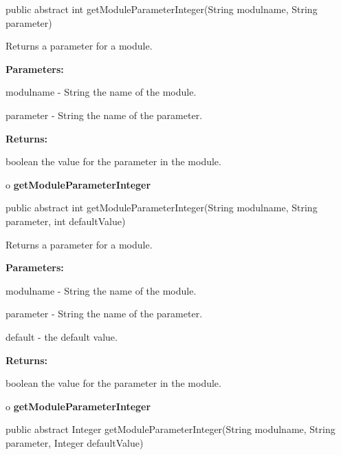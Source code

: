 \begin{PRE}
 public abstract int getModuleParameterInteger(String modulname,
                                               String parameter)
\end{PRE}

\begin{description}
\htmlDD Returns a parameter for a module. 

\begin{description}
\item {\bf Parameters:}  

modulname - String the name of the module.  

parameter - String the name of the parameter.  
\item {\bf Returns:}  

boolean the value for the parameter in the module.  
\end{description}

\end{description}

o {\bf getModuleParameterInteger} 

\begin{PRE}
 public abstract int getModuleParameterInteger(String modulname,
                                               String parameter,
                                               int defaultValue)
\end{PRE}

\begin{description}
\htmlDD Returns a parameter for a module. 

\begin{description}
\item {\bf Parameters:}  

modulname - String the name of the module.  

parameter - String the name of the parameter.  

default - the default value.  
\item {\bf Returns:}  

boolean the value for the parameter in the module.  
\end{description}

\end{description}

o {\bf getModuleParameterInteger} 

\begin{PRE}
 public abstract Integer getModuleParameterInteger(String modulname,
                                                   String parameter,
                                                   Integer defaultValue)
\end{PRE}

